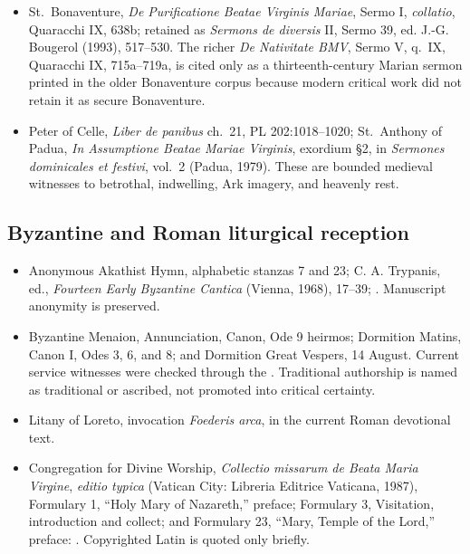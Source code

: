 \begin{itemize}
  \item St.~Bonaventure, \emph{De Purificatione Beatae Virginis Mariae}, Sermo I, \emph{collatio}, Quaracchi IX, 638b; retained as \emph{Sermons de diversis} II, Sermo 39, ed. J.-G. Bougerol (1993), 517--530.  The richer \emph{De Nativitate BMV}, Sermo V, q.~IX, Quaracchi IX, 715a--719a, is cited only as a thirteenth-century Marian sermon printed in the older Bonaventure corpus because modern critical work did not retain it as secure Bonaventure.
  \item Peter of Celle, \emph{Liber de panibus} ch.~21, PL 202:1018--1020; St.~Anthony of Padua, \emph{In Assumptione Beatae Mariae Virginis}, exordium §2, in \emph{Sermones dominicales et festivi}, vol.~2 (Padua, 1979).  These are bounded medieval witnesses to betrothal, indwelling, Ark imagery, and heavenly rest.
\end{itemize}

\subsection{Byzantine and Roman liturgical reception}

\begin{itemize}
  \item Anonymous Akathist Hymn, alphabetic stanzas 7 and 23; C. A. Trypanis, ed., \emph{Fourteen Early Byzantine Cantica} (Vienna, 1968), 17--39; .  Manuscript anonymity is preserved.
  \item Byzantine Menaion, Annunciation, Canon, Ode 9 heirmos; Dormition Matins, Canon I, Odes 3, 6, and 8; and Dormition Great Vespers, 14 August.  Current service witnesses were checked through the .  Traditional authorship is named as traditional or ascribed, not promoted into critical certainty.
  \item Litany of Loreto, invocation \emph{Foederis arca}, in the current Roman devotional text.
  \item Congregation for Divine Worship, \emph{Collectio missarum de Beata Maria Virgine}, \emph{editio typica} (Vatican City: Libreria Editrice Vaticana, 1987), Formulary 1, ``Holy Mary of Nazareth,'' preface; Formulary 3, Visitation, introduction and collect; and Formulary 23, ``Mary, Temple of the Lord,'' preface: .  Copyrighted Latin is quoted only briefly.
\end{itemize}

